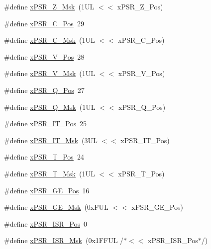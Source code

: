 \begin{DoxyCompactItemize}
\#define \hyperlink{group__CMSIS__CORE_ga907599209fba99f579778e662021c4f2}{x\+P\+S\+R\+\_\+\+Z\+\_\+\+Msk}~(1\+U\+L $<$$<$ x\+P\+S\+R\+\_\+\+Z\+\_\+\+Pos)
\item 
\#define \hyperlink{group__CMSIS__CORE_ga14adb79b91f6634b351a1b57394e2db6}{x\+P\+S\+R\+\_\+\+C\+\_\+\+Pos}~29
\item 
\#define \hyperlink{group__CMSIS__CORE_ga21e2497255d380f956ca0f48d11d0775}{x\+P\+S\+R\+\_\+\+C\+\_\+\+Msk}~(1\+U\+L $<$$<$ x\+P\+S\+R\+\_\+\+C\+\_\+\+Pos)
\item 
\#define \hyperlink{group__CMSIS__CORE_gae0cfbb394490db402623d97e6a979e00}{x\+P\+S\+R\+\_\+\+V\+\_\+\+Pos}~28
\item 
\#define \hyperlink{group__CMSIS__CORE_gab07f94ed3b6ee695f5af719dc27995c2}{x\+P\+S\+R\+\_\+\+V\+\_\+\+Msk}~(1\+U\+L $<$$<$ x\+P\+S\+R\+\_\+\+V\+\_\+\+Pos)
\item 
\#define \hyperlink{group__CMSIS__CORE_gaabb4178d50676a8f19cf8f727f38ace8}{x\+P\+S\+R\+\_\+\+Q\+\_\+\+Pos}~27
\item 
\#define \hyperlink{group__CMSIS__CORE_ga133ac393c38559ae43ac36383e731dd4}{x\+P\+S\+R\+\_\+\+Q\+\_\+\+Msk}~(1\+U\+L $<$$<$ x\+P\+S\+R\+\_\+\+Q\+\_\+\+Pos)
\item 
\#define \hyperlink{group__CMSIS__CORE_gac5be1db1343f776ecd00f0a4ebe70a46}{x\+P\+S\+R\+\_\+\+I\+T\+\_\+\+Pos}~25
\item 
\#define \hyperlink{group__CMSIS__CORE_ga6dc177aab488851bb3b98cf4b420141a}{x\+P\+S\+R\+\_\+\+I\+T\+\_\+\+Msk}~(3\+U\+L $<$$<$ x\+P\+S\+R\+\_\+\+I\+T\+\_\+\+Pos)
\item 
\#define \hyperlink{group__CMSIS__CORE_ga98d801da9a49cda944f52aeae104dd38}{x\+P\+S\+R\+\_\+\+T\+\_\+\+Pos}~24
\item 
\#define \hyperlink{group__CMSIS__CORE_ga30ae2111816e82d47636a8d4577eb6ee}{x\+P\+S\+R\+\_\+\+T\+\_\+\+Msk}~(1\+U\+L $<$$<$ x\+P\+S\+R\+\_\+\+T\+\_\+\+Pos)
\item 
\#define \hyperlink{group__CMSIS__CORE_gae2b0f3def0f378e9f1d10a4c727a064b}{x\+P\+S\+R\+\_\+\+G\+E\+\_\+\+Pos}~16
\item 
\#define \hyperlink{group__CMSIS__CORE_ga967634e605d013e9b07002eca31f7903}{x\+P\+S\+R\+\_\+\+G\+E\+\_\+\+Msk}~(0x\+F\+U\+L $<$$<$ x\+P\+S\+R\+\_\+\+G\+E\+\_\+\+Pos)
\item 
\#define \hyperlink{group__CMSIS__CORE_ga21bff245fb1aef9683f693d9d7bb2233}{x\+P\+S\+R\+\_\+\+I\+S\+R\+\_\+\+Pos}~0
\item 
\#define \hyperlink{group__CMSIS__CORE_gadf8eed87e0081dfe1ef1c78a0ea91afd}{x\+P\+S\+R\+\_\+\+I\+S\+R\+\_\+\+Msk}~(0x1\+F\+F\+U\+L /$\ast$$<$$<$ x\+P\+S\+R\+\_\+\+I\+S\+R\+\_\+\+Pos$\ast$/)
$$
\end{DoxyCompactItemize}

